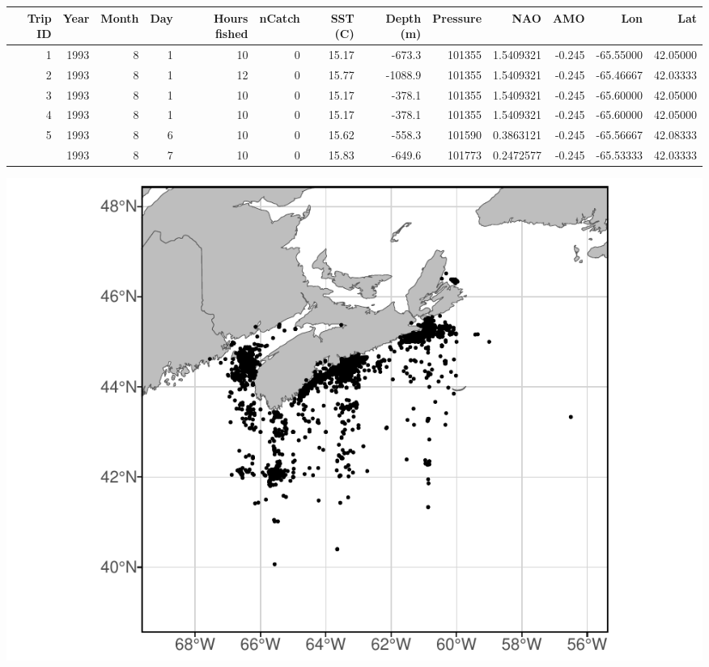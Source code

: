 \documentclass[
]{article}
\let\origfigure\figure
\let\endorigfigure\endfigure
\renewenvironment{figure}[1][2] {
    \expandafter\origfigure\expandafter[H]
} {
    \endorigfigure
}
\let\origtable\table
\let\endorigtable\endtable
\renewenvironment{table}[1][2] {
    \expandafter\origtable\expandafter[H]
} {
    \endorigtable
}
\begin{document}
\begin{landscape}\begin{table}[H]

\caption{\label{tab:mergecan}Table 3: Canadian commercial data example}
\centering
\begin{tabular}[t]{rrrrrrrrrrrrr}
\toprule
Trip
ID & Year & Month & Day & Hours
fished & nCatch & SST
(C) & Depth
(m) & Pressure & NAO & AMO & Lon & Lat\\
\midrule
1 & 1993 & 8 & 1 & 10 & 0 & 15.17 & -673.3 & 101355 & 1.5409321 & -0.245 & -65.55000 & 42.05000\\
2 & 1993 & 8 & 1 & 12 & 0 & 15.77 & -1088.9 & 101355 & 1.5409321 & -0.245 & -65.46667 & 42.03333\\
3 & 1993 & 8 & 1 & 10 & 0 & 15.17 & -378.1 & 101355 & 1.5409321 & -0.245 & -65.60000 & 42.05000\\
4 & 1993 & 8 & 1 & 10 & 0 & 15.17 & -378.1 & 101355 & 1.5409321 & -0.245 & -65.60000 & 42.05000\\
5 & 1993 & 8 & 6 & 10 & 0 & 15.62 & -558.3 & 101590 & 0.3863121 & -0.245 & -65.56667 & 42.08333\\
\addlinespace
6 & 1993 & 8 & 7 & 10 & 0 & 15.83 & -649.6 & 101773 & 0.2472577 & -0.245 & -65.53333 & 42.03333\\
\bottomrule
\end{tabular}
\end{table}
\end{landscape}

\begin{figure}
\centering
\includegraphics{Model_Prelim_Report_files/figure-latex/canadianplot-1.pdf}
\caption{\label{fig:canadianplot}Fig. 3: Spatial distribution of Canadian commercial catch}
\end{figure}
\end{document}
